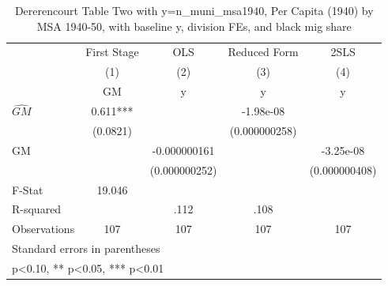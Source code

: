 \begin{table}[htbp]\centering
\def\sym#1{\ifmmode^{#1}\else\(^{#1}\)\fi}
\caption{Dererencourt Table Two with y=n\_muni\_msa1940, Per Capita (1940) by MSA 1940-50, with baseline y, division FEs, and black mig share}
\begin{tabular}{l*{4}{c}}
\toprule
                    & First Stage   &         OLS   &Reduced Form   &        2SLS   \\
                    &\multicolumn{1}{c}{(1)}&\multicolumn{1}{c}{(2)}&\multicolumn{1}{c}{(3)}&\multicolumn{1}{c}{(4)}\\
                    &\multicolumn{1}{c}{GM}&\multicolumn{1}{c}{y}&\multicolumn{1}{c}{y}&\multicolumn{1}{c}{y}\\
\midrule
$\hat{GM}$          &       0.611***&               &   -1.98e-08   &               \\
                    &    (0.0821)   &               &(0.000000258)   &               \\
\addlinespace
GM                  &               &-0.000000161   &               &   -3.25e-08   \\
                    &               &(0.000000252)   &               &(0.000000408)   \\
\midrule
F-Stat              &      19.046   &               &               &               \\
R-squared           &               &        .112   &        .108   &               \\
Observations        &         107   &         107   &         107   &         107   \\
\bottomrule
\multicolumn{5}{l}{\footnotesize Standard errors in parentheses}\\
\multicolumn{5}{l}{\footnotesize * p<0.10, ** p<0.05, *** p<0.01}\\
\end{tabular}
\end{table}

